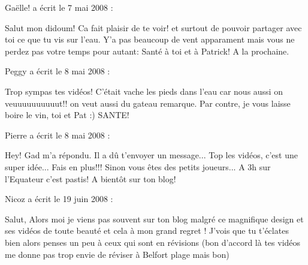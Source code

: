 \medskip
Gaëlle! a écrit le 7 mai 2008 :
\begin{displayquote}
Salut mon didoum!
Ca fait plaisir de te voir! et surtout de pouvoir partager avec toi ce que tu vis sur l'eau.
Y'a pas beaucoup de vent apparament mais vous ne perdez pas votre temps pour autant: Santé à toi et à Patrick!
A la prochaine.
\end{displayquote}

\medskip
Peggy a écrit le 8 mai 2008 :
\begin{displayquote}
Trop sympas tes vidéos!
C'était vache les pieds dans l'eau car nous aussi on veuuuuuuuuuut!! on veut aussi du gateau remarque.
Par contre, je vous laisse boire le vin, toi et Pat :) SANTE!
\end{displayquote}

\medskip
Pierre a écrit le 8 mai 2008 :
\begin{displayquote}
Hey!
Gad m'a répondu. Il a dû t'envoyer un message...
Top les vidéos, c'est une super idée... Fais en plus!!!
Sinon vous êtes des petits joueurs... A 3h sur l'Equateur c'est pastis!
A bientôt sur ton blog!
\end{displayquote}

\medskip
Nicoz a écrit le 19 juin 2008 :
\begin{displayquote}
Salut,
Alors moi je viens pas souvent sur ton blog malgré ce magnifique design et ses vidéos de toute beauté et cela à mon grand regret !
J'vois que tu t'éclates bien alors penses un peu à ceux qui sont en révisions (bon d'accord là tes vidéos me donne pas trop envie de réviser à Belfort plage mais bon)
\end{displayquote}

\vfill
